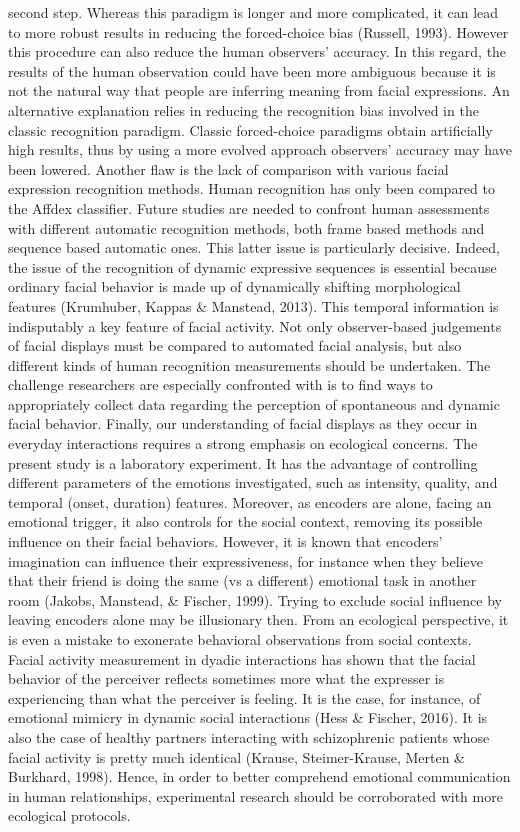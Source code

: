 \documentclass[man]{apa6}
\begin{document}
second step. Whereas this paradigm is longer and more complicated, it can lead to more robust results in reducing the forced-choice bias (Russell, 1993). However this procedure can also reduce the human observers' accuracy. In this regard, the results of the human observation could have been more ambiguous because it is not the natural way that people are inferring meaning from facial expressions. An alternative explanation relies in reducing the recognition bias involved in the classic recognition paradigm. Classic forced-choice paradigms obtain artificially high results, thus by using a more evolved approach observers' accuracy may have been lowered. Another flaw is the lack of comparison with various facial expression recognition methods. Human recognition has only been compared to the Affdex classifier. Future studies are needed to confront human assessments with different automatic recognition methods, both frame based methods and sequence based automatic ones. This latter issue is particularly decisive. Indeed, the issue of the recognition of dynamic expressive sequences is essential because ordinary facial behavior is made up of dynamically shifting morphological features (Krumhuber, Kappas \& Manstead, 2013). This temporal information is indisputably a key feature of facial activity. Not only observer-based judgements of facial displays must be compared to automated facial analysis, but also different kinds of human recognition measurements should be undertaken. The challenge researchers are especially confronted with is to find ways to appropriately collect data regarding the perception of spontaneous and dynamic facial behavior. Finally, our understanding of facial displays as they occur in everyday interactions requires a strong emphasis on ecological concerns. The present study is a laboratory experiment. It has the advantage of controlling different parameters of the emotions investigated, such as intensity, quality, and temporal (onset, duration) features. Moreover, as encoders are alone, facing an emotional trigger, it also controls for the social context, removing its possible influence on their facial behaviors. However, it is known that encoders' imagination can influence their expressiveness, for instance when they believe that their friend is doing the same (vs a different) emotional task in another room (Jakobs, Manstead, \& Fischer, 1999). Trying to exclude social influence by leaving encoders alone may be illusionary then. From an ecological perspective, it is even a mistake to exonerate behavioral observations from social contexts. Facial activity measurement in dyadic interactions has shown that the facial behavior of the perceiver reflects sometimes more what the expresser is experiencing than what the perceiver is feeling. It is the case, for instance, of emotional mimicry in dynamic social interactions (Hess \& Fischer, 2016). It is also the case of healthy partners interacting with schizophrenic patients whose facial activity is pretty much identical (Krause, Steimer-Krause, Merten \& Burkhard, 1998). Hence, in order to better comprehend emotional communication in human relationships, experimental research should be corroborated with more ecological protocols.
\end{document}
